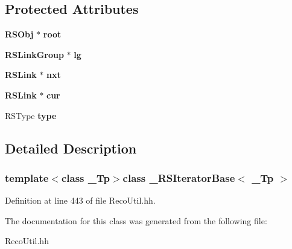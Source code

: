 \subsection*{Protected Attributes}
\begin{DoxyCompactItemize}
\item 
{\bf R\-S\-Obj} $\ast$ {\bfseries root}\label{class__RSIteratorBase_af96f1020e4efafc8106508034a64c69a}

\item 
{\bf R\-S\-Link\-Group} $\ast$ {\bfseries lg}\label{class__RSIteratorBase_ad54c4d5423dc09135301671c4cbd24b7}

\item 
{\bf R\-S\-Link} $\ast$ {\bfseries nxt}\label{class__RSIteratorBase_a1630611fa3ae296aced716c08721c163}

\item 
{\bf R\-S\-Link} $\ast$ {\bfseries cur}\label{class__RSIteratorBase_a061cc072cef6ae5f9c849742e59ce700}

\item 
R\-S\-Type {\bfseries type}\label{class__RSIteratorBase_a4d1df4dc2b03c6d03310ddc85ca3848b}

\end{DoxyCompactItemize}


\subsection{Detailed Description}
\subsubsection*{template$<$class \-\_\-\-Tp$>$class \-\_\-\-R\-S\-Iterator\-Base$<$ \-\_\-\-Tp $>$}



Definition at line 443 of file Reco\-Util.\-hh.



The documentation for this class was generated from the following file\-:\begin{DoxyCompactItemize}
\item 
Reco\-Util.\-hh\end{DoxyCompactItemize}
